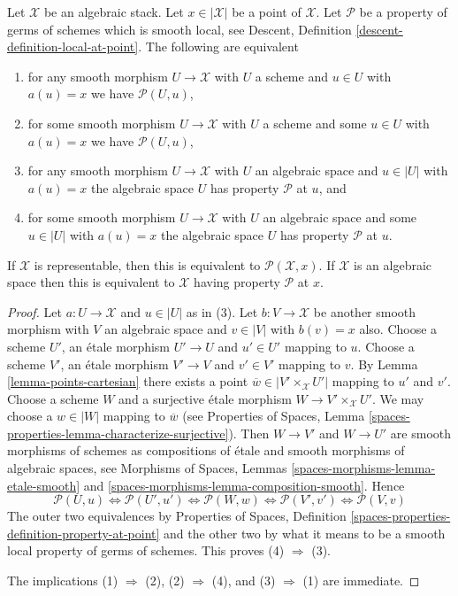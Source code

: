 \begin{lemma}
\label{lemma-local-source-target-at-point}
Let $\mathcal{X}$ be an algebraic stack.
Let $x \in |\mathcal{X}|$ be a point of $\mathcal{X}$.
Let $\mathcal{P}$ be a property of germs of schemes which is smooth local, see
Descent, Definition \ref{descent-definition-local-at-point}.
The following are equivalent
\begin{enumerate}
\item for any smooth morphism $U \to \mathcal{X}$ with $U$ a scheme
and $u \in U$ with $a(u) = x$ we have $\mathcal{P}(U, u)$,
\item for some smooth morphism $U \to \mathcal{X}$ with $U$ a scheme
and some $u \in U$ with $a(u) = x$ we have $\mathcal{P}(U, u)$,
\item for any smooth morphism $U \to \mathcal{X}$ with $U$ an algebraic space
and $u \in |U|$ with $a(u) = x$ the algebraic space $U$ has property
$\mathcal{P}$ at $u$, and
\item for some smooth morphism $U \to \mathcal{X}$ with $U$ an
algebraic space and some $u \in |U|$ with $a(u) = x$ the algebraic space
$U$ has property $\mathcal{P}$ at $u$.
\end{enumerate}
If $\mathcal{X}$ is representable, then this is equivalent to
$\mathcal{P}(\mathcal{X}, x)$. If $\mathcal{X}$ is an algebraic space then
this is equivalent to $\mathcal{X}$ having property $\mathcal{P}$ at $x$.
\end{lemma}

\begin{proof}
Let $a : U \to \mathcal{X}$ and $u \in |U|$ as in (3). Let
$b : V \to \mathcal{X}$ be another smooth morphism with $V$ an algebraic
space and $v \in |V|$ with $b(v) = x$ also.
Choose a scheme $U'$, an \'etale morphism $U' \to U$ and $u' \in U'$
mapping to $u$. Choose a scheme $V'$, an \'etale morphism $V' \to V$
and $v' \in V'$ mapping to $v$. By
Lemma \ref{lemma-points-cartesian}
there exists a point $\overline{w} \in |V' \times_\mathcal{X} U'|$
mapping to $u'$ and $v'$. Choose a scheme $W$ and a surjective \'etale
morphism $W \to V' \times_\mathcal{X} U'$. We may choose a
$w \in |W|$ mapping to $\overline{w}$ (see
Properties of Spaces,
Lemma \ref{spaces-properties-lemma-characterize-surjective}).
Then $W \to V'$ and $W \to U'$ are smooth morphisms of schemes
as compositions of \'etale and smooth morphisms of algebraic spaces, see
Morphisms of Spaces, Lemmas \ref{spaces-morphisms-lemma-etale-smooth} and
\ref{spaces-morphisms-lemma-composition-smooth}.
Hence
$$
\mathcal{P}(U, u)
\Leftrightarrow
\mathcal{P}(U', u')
\Leftrightarrow
\mathcal{P}(W, w)
\Leftrightarrow
\mathcal{P}(V', v')
\Leftrightarrow
\mathcal{P}(V, v)
$$
The outer two equivalences by
Properties of Spaces,
Definition \ref{spaces-properties-definition-property-at-point}
and the other two by what it means to be a smooth local property
of germs of schemes. This proves (4) $\Rightarrow$ (3).

\medskip\noindent
The implications (1) $\Rightarrow$ (2), (2) $\Rightarrow$ (4),
and (3) $\Rightarrow$ (1) are immediate.
\end{proof}

